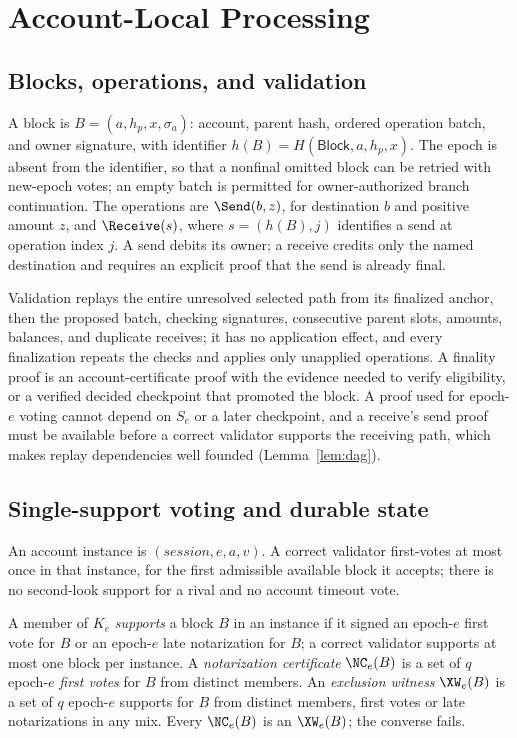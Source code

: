 \section{Account-Local Processing}
\label{sec:account}
\subsection{Blocks, operations, and validation}
A block is $B=(a,h_p,x,\sigma_a)$: account, parent hash, ordered operation batch, and owner signature, with identifier $h(B)=H(\mathsf{Block},a,h_p,x)$. The epoch is absent from the identifier, so that a nonfinal omitted block can be retried with new-epoch votes; an empty batch is permitted for owner-authorized branch continuation. The operations are $\Send(b,z)$, for destination $b$ and positive amount $z$, and $\Receive(s)$, where $s=(h(B),j)$ identifies a send at operation index $j$. A send debits its owner; a receive credits only the named destination and requires an explicit proof that the send is already final.

Validation replays the entire unresolved selected path from its finalized anchor, then the proposed batch, checking signatures, consecutive parent slots, amounts, balances, and duplicate receives; it has no application effect, and every finalization repeats the checks and applies only unapplied operations. A finality proof is an account-certificate proof with the evidence needed to verify eligibility, or a verified decided checkpoint that promoted the block. A proof used for epoch-$e$ voting cannot depend on $S_e$ or a later checkpoint, and a receive's send proof must be available before a correct validator supports the receiving path, which makes replay dependencies well founded (Lemma~\ref{lem:dag}).

\subsection{Single-support voting and durable state}
\label{sec:voting}
An account instance is $(\mathit{session},e,a,v)$. A correct validator first-votes at most once in that instance, for the first admissible available block it accepts; there is no second-look support for a rival and no account timeout vote.

\begin{definition}
\label{def:support}
A member of $K_e$ \emph{supports} a block $B$ in an instance if it signed an epoch-$e$ first vote for $B$ or an epoch-$e$ late notarization for $B$; a correct validator supports at most one block per instance. A \emph{notarization certificate} $\NC_e(B)$ is a set of $q$ epoch-$e$ \emph{first votes} for $B$ from distinct members. An \emph{exclusion witness} $\XW_e(B)$ is a set of $q$ epoch-$e$ supports for $B$ from distinct members, first votes or late notarizations in any mix. Every $\NC_e(B)$ is an $\XW_e(B)$; the converse fails.
\end{definition}

